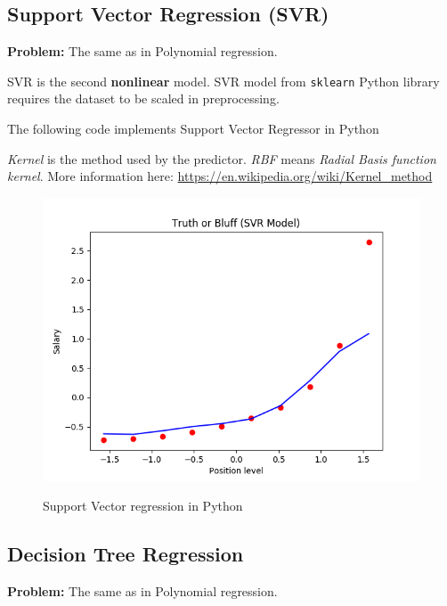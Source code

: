 \documentclass[runningheads,a4paper]{llncs}
\begin{document}
\subsection{Support Vector Regression (SVR)}

\textbf{Problem:} The same as in Polynomial regression. 

SVR is the second \textbf{nonlinear} model. SVR model from \verb|sklearn| Python library requires the dataset to be scaled in preprocessing.

The following code implements Support Vector Regressor in Python 

 

\textit{Kernel} is the method used by the predictor. \textit{RBF} means \textit{Radial Basis function kernel}. More information here: \url{https://en.wikipedia.org/wiki/Kernel_method}


\begin{figure}[H]
\centering
\begin{center}
\includegraphics[scale=0.8]{pics/svr_python}
\label{uloha1:pic1}
\caption{Support Vector regression in Python} 
\end{center}
\end{figure}

\subsection{Decision Tree Regression}

\textbf{Problem:} The same as in Polynomial regression.
\end{document}
